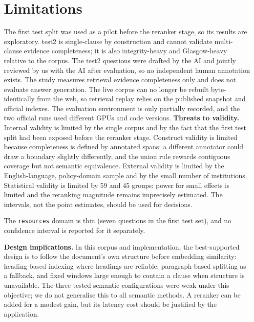 \documentclass[conference]{IEEEtran}
\begin{document}
\section{Limitations}
The first test split was used as a pilot before the reranker stage, so its results are exploratory. test2 is single-clause by construction and cannot validate multi-clause evidence completeness; it is also integrity-heavy and Glasgow-heavy relative to the corpus. The test2 questions were drafted by the AI and jointly reviewed by us with the AI after evaluation, so no independent human annotation exists. The study measures retrieval evidence completeness only and does not evaluate answer generation. The live corpus can no longer be rebuilt byte-identically from the web, so retrieval replay relies on the published snapshot and official indexes. The evaluation environment is only partially recorded, and the two official runs used different GPUs and code versions. \textbf{Threats to validity.}
Internal validity is limited by the single corpus and by the fact that the first test split had been exposed before the reranker stage. Construct validity is limited because completeness is defined by annotated spans: a different annotator could draw a boundary slightly differently, and the union rule rewards contiguous coverage but not semantic equivalence. External validity is limited by the English-language, policy-domain sample and by the small number of institutions. Statistical validity is limited by 59 and 45 groups: power for small effects is limited and the reranking magnitude remains imprecisely estimated. The intervals, not the point estimates, should be used for decisions.

The \texttt{resources} domain is thin (seven questions in the first test set), and no confidence interval is reported for it separately.

\textbf{Design implications.}
In this corpus and implementation, the best-supported design is to follow the document's own structure before embedding similarity: heading-based indexing where headings are reliable, paragraph-based splitting as a fallback, and fixed windows large enough to contain a clause when structure is unavailable. The three tested semantic configurations were weak under this objective; we do not generalise this to all semantic methods. A reranker can be added for a modest gain, but its latency cost should be justified by the application.
\end{document}

